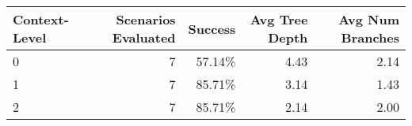 \begin{tabular}{lrrrr}
\toprule
Context-Level & Scenarios Evaluated & Success & Avg Tree Depth & Avg Num Branches \\
\midrule
0 & 7 & 57.14\% & 4.43 & 2.14 \\
1 & 7 & 85.71\% & 3.14 & 1.43 \\
2 & 7 & 85.71\% & 2.14 & 2.00 \\
\bottomrule
\end{tabular}

